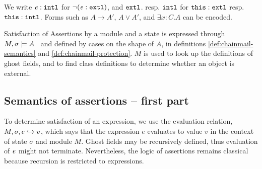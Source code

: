 \begin{definition}[Shorthands] 
{We write $\mathit{e}:\mbox{\normalfont{\texttt{intl}}}$ for $\neg (\mathit{e}:\mbox{\normalfont{\texttt{extl}}})$}, and
$\mbox{\normalfont{\texttt{extl}}}$. resp. {$\mbox{\normalfont{\texttt{intl}}}$} for $\mbox{\normalfont{\texttt{this}}}:\mbox{\normalfont{\texttt{extl}}}$ resp. $\mbox{\normalfont{\texttt{this}}}:\mbox{\normalfont{\texttt{intl}}}$. %
Forms such as $A \rightarrow A'$,  $A \vee A'$, and $\exists x:C.A$  can be encoded.
\end{definition}



\label{def:chainmail-semantics-all}
\label{dup:def:chainmail-semantics}
\noindent
Satisfaction  of Assertions by a module and a state is expressed  through \ $M , \sigma \models {A}$ \  and defined by cases on the shape of $A$, in definitions \ref{def:chainmail-semantics}  and 
 \ref{def:chainmail-protection}.
 {$M$} is used %
 to look up the definitions of ghost fields, and to find class definitions to determine whether an object is  external.
 
\noindent

\subsection{Semantics of assertions %
-- first part}
\label{sect:semantics:assert:standard}

To determine satisfaction of an expression, we    use the evaluation relation, $M, \sigma, e \hookrightarrow v$,
which says that the expression $e$ evaluates
to value $v$ in the context of state $\sigma$ and module $M$.
{Ghost fields may be recursively defined, thus evaluation of $\mathit{e}$ might}
 not  terminate. Nevertheless, the logic of  assertions %
 remains classical because recursion is restricted to expressions. %


